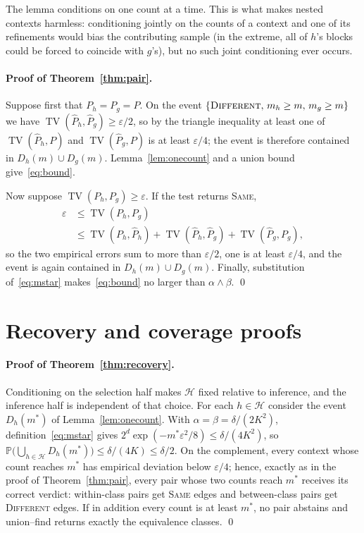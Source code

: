 \documentclass{article}
\newcommand{\cH}{\mathcal H}
\newcommand{\Prb}{\mathbb P}
\newcommand{\eps}{\varepsilon}
\DeclareMathOperator{\TV}{TV}
\begin{document}
The lemma conditions on one count at a time.  This is what makes nested
contexts harmless: conditioning jointly on the counts of a context and one
of its refinements would bias the contributing sample (in the extreme, all
of $h$'s blocks could be forced to coincide with $g$'s), but no such joint
conditioning ever occurs.

\paragraph{Proof of Theorem~\ref{thm:pair}.}
Suppose first that $P_h=P_g=P$.  On the event
$\{\textsc{Different},\,m_h\ge m,\,m_g\ge m\}$ we have
$\TV(\widehat P_h,\widehat P_g)\ge\eps/2$, so by the triangle inequality
at least one of $\TV(\widehat P_h,P)$ and $\TV(\widehat P_g,P)$ is at least
$\eps/4$; the event is therefore contained in $D_h(m)\cup D_g(m)$.
Lemma~\ref{lem:onecount} and a union bound give~\eqref{eq:bound}.

Now suppose $\TV(P_h,P_g)\ge\eps$.  If the test returns \textsc{Same},
\begin{align*}
\eps
&\le \TV(P_h,P_g)\\
&\le \TV(P_h,\widehat P_h)
  +\TV(\widehat P_h,\widehat P_g)
  +\TV(\widehat P_g,P_g),
\end{align*}
so the two empirical errors sum to more than $\eps/2$, one is at least
$\eps/4$, and the event is again contained in $D_h(m)\cup D_g(m)$.  Finally,
substitution of~\eqref{eq:mstar} makes~\eqref{eq:bound} no larger than
$\alpha\wedge\beta$. \qed

\section{Recovery and coverage proofs}

\paragraph{Proof of Theorem~\ref{thm:recovery}.}
Conditioning on the selection half makes $\cH$ fixed relative to inference,
and the inference half is independent of that choice.  For each $h\in\cH$
consider the event $D_h(m^*)$ of Lemma~\ref{lem:onecount}.  With
$\alpha=\beta=\delta/(2K^2)$, definition~\eqref{eq:mstar} gives
$2^d\exp(-m^*\eps^2/8)\le\delta/(4K^2)$, so
$\Prb\bigl(\bigcup_{h\in\cH}D_h(m^*)\bigr)\le\delta/(4K)\le\delta/2$.
On the complement, every context whose count reaches $m^*$ has empirical
deviation below $\eps/4$; hence, exactly as in the proof of
Theorem~\ref{thm:pair}, every pair whose two counts reach $m^*$ receives its
correct verdict: within-class pairs get \textsc{Same} edges and
between-class pairs get \textsc{Different} edges.  If in addition every
count is at least $m^*$, no pair abstains and union--find returns exactly
the equivalence classes. \qed
\end{document}
